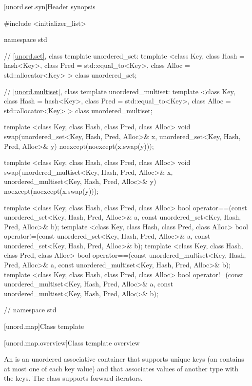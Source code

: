 [unord.set.syn]{Header  synopsis}%
%
%
%
\begin{codeblock}
#include <initializer_list>

namespace std {
  // \ref{unord.set}, class template unordered_set:
  template <class Key,
            class Hash = hash<Key>,
            class Pred = std::equal_to<Key>,
            class Alloc = std::allocator<Key> >
    class unordered_set;

  // \ref{unord.multiset}, class template unordered_multiset:
  template <class Key,
            class Hash = hash<Key>,
            class Pred = std::equal_to<Key>,
            class Alloc = std::allocator<Key> >
    class unordered_multiset;

  template <class Key, class Hash, class Pred, class Alloc>
    void swap(unordered_set<Key, Hash, Pred, Alloc>& x,
              unordered_set<Key, Hash, Pred, Alloc>& y)
      noexcept(noexcept(x.swap(y)));

  template <class Key, class Hash, class Pred, class Alloc>
    void swap(unordered_multiset<Key, Hash, Pred, Alloc>& x,
              unordered_multiset<Key, Hash, Pred, Alloc>& y)
      noexcept(noexcept(x.swap(y)));

  template <class Key, class Hash, class Pred, class Alloc>
    bool operator==(const unordered_set<Key, Hash, Pred, Alloc>& a,
                    const unordered_set<Key, Hash, Pred, Alloc>& b);
  template <class Key, class Hash, class Pred, class Alloc>
    bool operator!=(const unordered_set<Key, Hash, Pred, Alloc>& a,
                    const unordered_set<Key, Hash, Pred, Alloc>& b);
  template <class Key, class Hash, class Pred, class Alloc>
    bool operator==(const unordered_multiset<Key, Hash, Pred, Alloc>& a,
                    const unordered_multiset<Key, Hash, Pred, Alloc>& b);
  template <class Key, class Hash, class Pred, class Alloc>
    bool operator!=(const unordered_multiset<Key, Hash, Pred, Alloc>& a,
                    const unordered_multiset<Key, Hash, Pred, Alloc>& b);
} // namespace std
\end{codeblock}

[unord.map]{Class template }%

[unord.map.overview]{Class template  overview}

\pnum
{}%
%
An  is an unordered associative container that
supports unique keys (an  contains at most one of each
key value) and that associates values of another type
 with the keys.
The  class
supports forward iterators.

